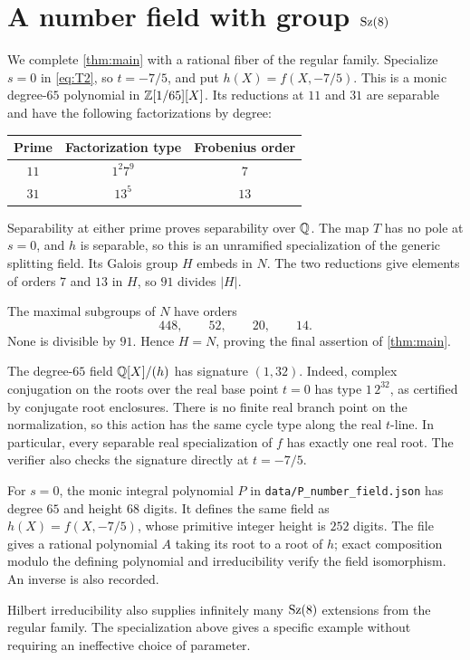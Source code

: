 \section{A number field with group \texorpdfstring{$\operatorname{Sz}(8)$}{Sz(8)}}\label{sec:specialization}

We complete \cref{thm:main} with a rational fiber of the regular family.
Specialize $s=0$ in \eqref{eq:T2}, so $t=-7/5$, and put
$h(X)=f(X,-7/5)$. This is a monic degree-$65$ polynomial in
$\mathbb{Z}[1/65][X]$. Its reductions at $11$ and $31$ are separable and have
the following factorizations by degree:
\begin{center}
\begin{tabular}{@{}ccc@{}}
\toprule
Prime&Factorization type&Frobenius order\\
\midrule
$11$&$1^2 7^9$&$7$\\
$31$&$13^5$&$13$\\
\bottomrule
\end{tabular}
\end{center}
Separability at either prime proves separability over $\mathbb{Q}$. The map $T$
has no pole at $s=0$, and $h$ is separable, so this is an unramified
specialization of the generic splitting field. Its Galois group
$H$ embeds in $N$. The two reductions give elements of orders $7$ and
$13$ in $H$, so $91$ divides $|H|$.

The maximal subgroups of $N$ have orders
\[
 448,\qquad52,\qquad20,\qquad14.
\]
None is divisible by $91$. Hence $H=N$, proving the final assertion of
\cref{thm:main}.

The degree-$65$ field $\mathbb{Q}[X]/(h)$ has signature $(1,32)$.
Indeed, complex conjugation on the roots over the real base point $t=0$
has type $1\,2^{32}$, as certified by conjugate root enclosures.
There is no finite real branch point on the normalization, so this action
has the same cycle type along the real $t$-line. In particular, every
separable real specialization of $f$ has exactly one real root. The
verifier also checks the signature directly at $t=-7/5$.

For $s=0$, the monic integral polynomial $P$ in
\texttt{data/P\_number\_field.json} has degree $65$ and height $68$ digits.
It defines the same field as $h(X)=f(X,-7/5)$, whose primitive integer
height is $252$ digits. The file gives a rational polynomial $A$ taking
its root to a root of $h$; exact composition modulo the defining polynomial
and irreducibility verify the field isomorphism. An inverse is also
recorded.

Hilbert irreducibility also supplies infinitely many $\operatorname{Sz}(8)$ extensions
from the regular family. The specialization above gives a specific example
without requiring an ineffective choice of parameter.
